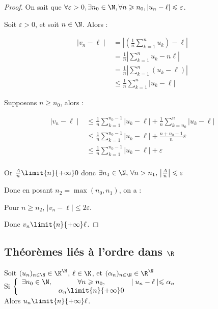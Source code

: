 \begin{proof}
    On sait que $\forall \varepsilon > 0, \exists n_0 \in \N, \forall n \geqslant n_0, |u_n - \ell| \leqslant \varepsilon$.

    Soit $\varepsilon > 0$, et soit $n \in \N$. Alors : 

    \begin{align*}
         \mid v_n - \ell \mid &= \left| \left(\frac{1}{n} \sum_{k=1}^n u_k\right) - \ell \right| \\
        &= \frac{1}{n} \left| \sum_{k=1}^n u_k - n \ell \right| \\
        &= \frac{1}{n} \left| \sum_{k=1}^n (u_k - \ell) \right| \\
        &\leqslant \frac{1}{n} \sum_{k=1}^n |u_k - \ell|
    \end{align*}
    

    Supposons $n \geqslant n_0$, alors :

    \begin{align*}
        \mid v_n - \ell \mid & \leqslant  \frac 1 n \sum_{k=1}^{n_0 - 1} |u_k - \ell| + \frac 1 n \sum_{k=n_0}^n |u_k - \ell| \\
        & \leqslant  \frac 1 n \sum_{k=1}^{n_0 - 1} |u_k - \ell| + \frac {n + n_0 - 1} n \varepsilon \\
         & \leqslant  \frac 1 n \sum_{k=1}^{n_0 - 1} |u_k - \ell| + \varepsilon \\
    \end{align*}

    Or $\frac A n \limit{n}{+\infty} 0$ donc $\exists n_1 \in \N, \, \forall n > n_1, \, \left| \frac A n \right| \leqslant \varepsilon $

    Donc en posant $n_2 = \max(n_0, n_1)$, on a : 

    Pour $n \geqslant n_2$, $\mid v_n - \ell \mid \leqslant 2\varepsilon$. 

    Donc $v_n \limit{n}{+\infty} \ell$.
\end{proof}

\subsection{Théorèmes liés à l'ordre dans $\R$}

\begin{theoreme}{}{}
    Soit $(u_n)_{n \in \N} \in \K^{\N}$, $\ell \in \K$, et $(\alpha_n)_{n \in \N} \in \R^{\N}$ \\
    
    Si $\left\{ \begin{array}{lcl}
        \exists n_0 \in \N, & \forall n \geqslant n_0, & \mid u_n - \ell \mid \leqslant \alpha_n \\
        \space & \alpha_n \limit{n}{+\infty} 0 & \space \\
    \end{array} \right.
    $ \\

    Alors $u_n \limit{n}{+\infty} \ell$.
\end{theoreme}

